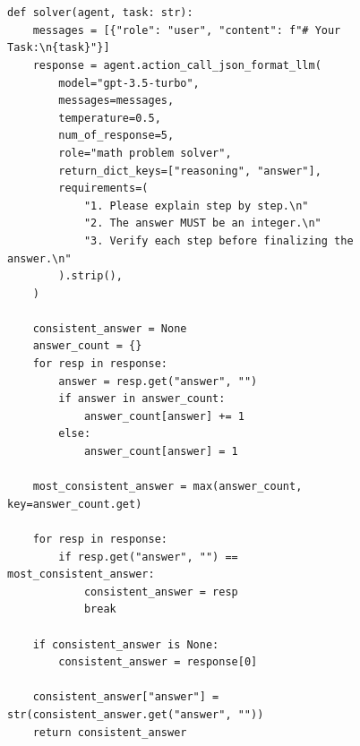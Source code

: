 \documentclass[11pt]{article}
\newcommand{\framework}{Gödel Agent\xspace}
\begin{document}
\begin{figure}[ht]
\begin{lstlisting}[style=pythonstyle, caption={Code of the best policy found by \framework for MGSM.}]


def solver(agent, task: str):
    messages = [{"role": "user", "content": f"# Your Task:\n{task}"}]
    response = agent.action_call_json_format_llm(
        model="gpt-3.5-turbo", 
        messages=messages, 
        temperature=0.5, 
        num_of_response=5,
        role="math problem solver", 
        return_dict_keys=["reasoning", "answer"], 
        requirements=(
            "1. Please explain step by step.\n"
            "2. The answer MUST be an integer.\n"
            "3. Verify each step before finalizing the answer.\n"
        ).strip(),
    )
    
    consistent_answer = None
    answer_count = {}
    for resp in response:
        answer = resp.get("answer", "")
        if answer in answer_count:
            answer_count[answer] += 1
        else:
            answer_count[answer] = 1
    
    most_consistent_answer = max(answer_count, key=answer_count.get)
    
    for resp in response:
        if resp.get("answer", "") == most_consistent_answer:
            consistent_answer = resp
            break
    
    if consistent_answer is None:
        consistent_answer = response[0]
    
    consistent_answer["answer"] = str(consistent_answer.get("answer", ""))
    return consistent_answer
\end{lstlisting}
\end{figure}
\end{document}
